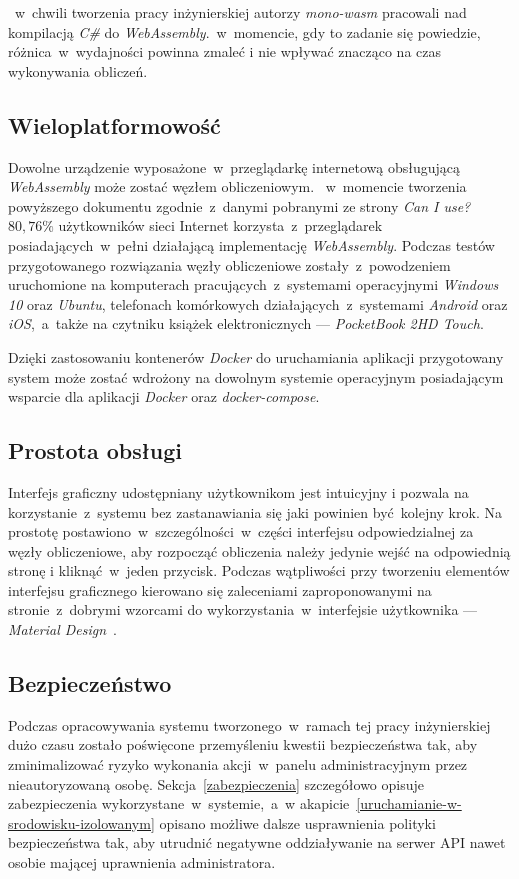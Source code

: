 \documentclass[a4paper,11pt,twoside]{report}
\theoremstyle{definition}
\begin{document}
           ~w~chwili tworzenia pracy inżynierskiej autorzy \textit{mono-wasm} pracowali nad kompilacją \textit{C\#} do \textit{WebAssembly}.~w~momencie, gdy to zadanie się powiedzie, różnica~w~wydajności powinna zmaleć i nie wpływać znacząco na czas wykonywania obliczeń.
            
        \subsection{Wieloplatformowość}
            Dowolne urządzenie wyposażone~w~przeglądarkę internetową obsługującą \textit{WebAssembly} może zostać węzłem obliczeniowym.
           ~w~momencie tworzenia powyższego dokumentu zgodnie~z~danymi pobranymi ze strony \textit{Can I use?}~\cite{can-i-use} $80,76\%$ użytkowników sieci Internet korzysta~z~przeglądarek posiadających~w~pełni działającą implementację \textit{WebAssembly}.
            Podczas testów przygotowanego rozwiązania węzły obliczeniowe zostały~z~powodzeniem uruchomione na komputerach pracujących~z~systemami operacyjnymi \textit{Windows 10} oraz \textit{Ubuntu}, telefonach komórkowych działających~z~systemami \textit{Android} oraz \textit{iOS},~a~także na czytniku książek elektronicznych --- \textit{PocketBook 2HD Touch}.
            
            Dzięki zastosowaniu kontenerów \textit{Docker} do uruchamiania aplikacji przygotowany system może zostać wdrożony na dowolnym systemie operacyjnym posiadającym wsparcie dla aplikacji \textit{Docker} oraz \textit{docker-compose}.
        
        \subsection{Prostota obsługi}
            Interfejs graficzny udostępniany użytkownikom jest intuicyjny i pozwala na korzystanie~z~systemu bez zastanawiania się jaki powinien być kolejny krok.
            Na prostotę postawiono~w~szczególności~w~części interfejsu odpowiedzialnej za węzły obliczeniowe, aby rozpocząć obliczenia należy jedynie wejść na odpowiednią stronę i kliknąć~w~jeden przycisk.
            Podczas wątpliwości przy tworzeniu elementów interfejsu graficznego kierowano się zaleceniami zaproponowanymi na stronie~z~dobrymi wzorcami do wykorzystania~w~interfejsie użytkownika --- \textit{Material Design}~\cite{material-design}.
        
        \subsection{Bezpieczeństwo}
            Podczas opracowywania systemu tworzonego~w~ramach tej pracy inżynierskiej dużo czasu zostało poświęcone przemyśleniu kwestii bezpieczeństwa tak, aby zminimalizować ryzyko wykonania akcji~w~panelu administracyjnym przez nieautoryzowaną osobę.
            Sekcja~\ref{zabezpieczenia} szczegółowo opisuje zabezpieczenia wykorzystane~w~systemie,~a~w akapicie~\ref{uruchamianie-w-srodowisku-izolowanym} opisano możliwe dalsze usprawnienia polityki bezpieczeństwa tak, aby utrudnić negatywne oddziaływanie na serwer API nawet osobie mającej uprawnienia administratora.
    
\end{document}
